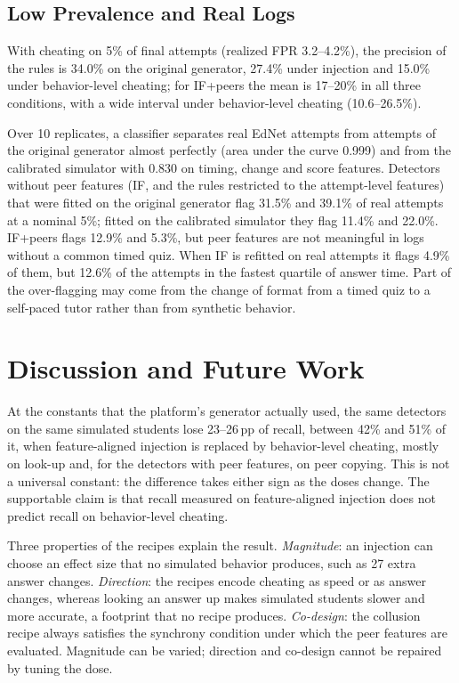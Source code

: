 \documentclass[conference,a4paper]{IEEEtran}
\newcommand{\pp}{\,pp}
\begin{document}
\subsection{Low Prevalence and Real Logs}
With cheating on 5\% of final attempts (realized FPR 3.2--4.2\%), the precision of the rules is 34.0\% on the original generator, 27.4\% under injection and 15.0\% under behavior-level cheating; for IF+peers the mean is 17--20\% in all three conditions, with a wide interval under behavior-level cheating (10.6--26.5\%).

Over 10 replicates, a classifier separates real EdNet attempts from attempts of the original generator almost perfectly (area under the curve 0.999) and from the calibrated simulator with 0.830 on timing, change and score features. Detectors without peer features (IF, and the rules restricted to the attempt-level features) that were fitted on the original generator flag 31.5\% and 39.1\% of real attempts at a nominal 5\%; fitted on the calibrated simulator they flag 11.4\% and 22.0\%. IF+peers flags 12.9\% and 5.3\%, but peer features are not meaningful in logs without a common timed quiz. When IF is refitted on real attempts it flags 4.9\% of them, but 12.6\% of the attempts in the fastest quartile of answer time. Part of the over-flagging may come from the change of format from a timed quiz to a self-paced tutor rather than from synthetic behavior.

\section{Discussion and Future Work}\label{sec:discussion}
At the constants that the platform's generator actually used, the same detectors on the same simulated students lose 23--26\pp{} of recall, between 42\% and 51\% of it, when feature-aligned injection is replaced by behavior-level cheating, mostly on look-up and, for the detectors with peer features, on peer copying. This is not a universal constant: the difference takes either sign as the doses change. The supportable claim is that recall measured on feature-aligned injection does not predict recall on behavior-level cheating.

Three properties of the recipes explain the result. \emph{Magnitude}: an injection can choose an effect size that no simulated behavior produces, such as 27 extra answer changes. \emph{Direction}: the recipes encode cheating as speed or as answer changes, whereas looking an answer up makes simulated students slower and more accurate, a footprint that no recipe produces. \emph{Co-design}: the collusion recipe always satisfies the synchrony condition under which the peer features are evaluated. Magnitude can be varied; direction and co-design cannot be repaired by tuning the dose.
\end{document}
